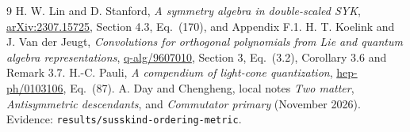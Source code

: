 \documentclass[11pt,a4paper]{article}
\begin{document}
\begin{thebibliography}{9}
 H. W. Lin and D. Stanford, \emph{A symmetry algebra in
double-scaled SYK}, \href{https://arxiv.org/abs/2307.15725}{arXiv:2307.15725},
Section 4.3, Eq.~(170), and Appendix F.1.
 H. T. Koelink and J. Van der Jeugt,
\emph{Convolutions for orthogonal polynomials from Lie and quantum algebra
representations}, \href{https://arxiv.org/abs/q-alg/9607010}{q-alg/9607010},
Section 3, Eq.~(3.2), Corollary 3.6 and Remark 3.7.
 H.-C. Pauli, \emph{A compendium of light-cone quantization},
\href{https://arxiv.org/abs/hep-ph/0103106}{hep-ph/0103106}, Eq.~(87).
 A. Day and Chengheng, local notes \emph{Two matter},
\emph{Antisymmetric descendants}, and \emph{Commutator primary}
(November 2026). Evidence: \texttt{results/susskind-ordering-metric}.
\end{thebibliography}
\end{document}
